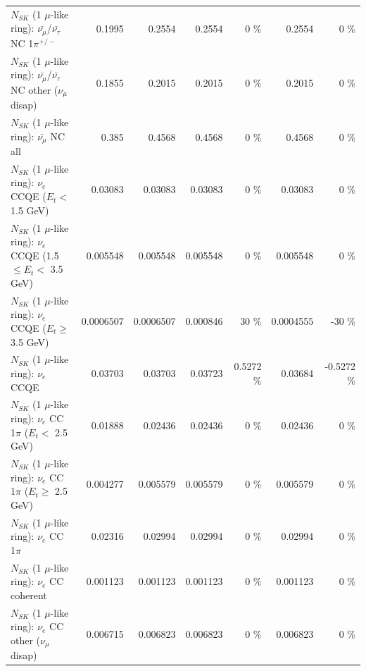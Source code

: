 \begin{table}
\begin{tabular}{| l | r | r | r  r | r  r |}
\hline
  $N_{SK}$ (1 $\mu$-like ring): $\bar{\nu_\mu}$/$\bar{\nu_\tau}$ NC 1$\pi^{+/-}$ &          0.1995 &          0.2554 &          0.2554 &        0 \%  &          0.2554 &        0 \%  \\ 
$N_{SK}$ (1 $\mu$-like ring): $\bar{\nu_\mu}$/$\bar{\nu_\tau}$ NC other ($\nu_\mu$ disap) &          0.1855 &          0.2015 &          0.2015 &        0 \%  &          0.2015 &        0 \%  \\ 
                          $N_{SK}$ (1 $\mu$-like ring): $\bar{\nu_{\mu}}$ NC all &           0.385 &          0.4568 &          0.4568 &        0 \%  &          0.4568 &        0 \%  \\ 
\hline
\hline
\hline
                  $N_{SK}$ (1 $\mu$-like ring): $\nu_e$ CCQE ($E_{t} <$ 1.5 GeV) &         0.03083 &         0.03083 &         0.03083 &        0 \%  &         0.03083 &        0 \%  \\ 
         $N_{SK}$ (1 $\mu$-like ring): $\nu_e$ CCQE (1.5 $\leq E_{t} <$ 3.5 GeV) &        0.005548 &        0.005548 &        0.005548 &        0 \%  &        0.005548 &        0 \%  \\ 
               $N_{SK}$ (1 $\mu$-like ring): $\nu_e$ CCQE ($E_{t} \geq$ 3.5 GeV) &       0.0006507 &       0.0006507 &        0.000846 &       30 \%  &       0.0004555 &      -30 \%  \\ 
\hline
                                      $N_{SK}$ (1 $\mu$-like ring): $\nu_e$ CCQE &         0.03703 &         0.03703 &         0.03723 &   0.5272 \%  &         0.03684 &  -0.5272 \%  \\ 
\hline
             $N_{SK}$ (1 $\mu$-like ring): $\nu_e$ CC 1$\pi$ ($E_{t} <$ 2.5 GeV) &         0.01888 &         0.02436 &         0.02436 &        0 \%  &         0.02436 &        0 \%  \\ 
          $N_{SK}$ (1 $\mu$-like ring): $\nu_e$ CC 1$\pi$ ($E_{t} \geq$ 2.5 GeV) &        0.004277 &        0.005579 &        0.005579 &        0 \%  &        0.005579 &        0 \%  \\ 
\hline
                                 $N_{SK}$ (1 $\mu$-like ring): $\nu_e$ CC 1$\pi$ &         0.02316 &         0.02994 &         0.02994 &        0 \%  &         0.02994 &        0 \%  \\ 
                               $N_{SK}$ (1 $\mu$-like ring): $\nu_e$ CC coherent &        0.001123 &        0.001123 &        0.001123 &        0 \%  &        0.001123 &        0 \%  \\ 
                $N_{SK}$ (1 $\mu$-like ring): $\nu_e$ CC other ($\nu_\mu$ disap) &        0.006715 &        0.006823 &        0.006823 &        0 \%  &        0.006823 &        0 \%  \\ 

\end{tabular}
\end{table}
